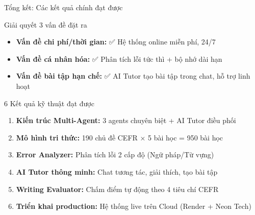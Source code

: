 \documentclass[notheorems,hyperref={bookmarks=true}]{beamer}
\begin{document}
\begin{frame}{Tổng kết: Các kết quả chính đạt được}
\begin{exampleblock}{Giải quyết 3 vấn đề đặt ra}
    \begin{itemize}
        \item \textbf{Vấn đề chi phí/thời gian:} ✅ Hệ thống online miễn phí, 24/7
        \item \textbf{Vấn đề cá nhân hóa:} ✅ Phân tích lỗi tức thì + bộ nhớ dài hạn
        \item \textbf{Vấn đề bài tập hạn chế:} ✅ AI Tutor tạo bài tập trong chat, hỗ trợ linh hoạt
    \end{itemize}
\end{exampleblock}

\begin{block}{6 Kết quả kỹ thuật đạt được}
    \begin{enumerate}
        \item \textbf{Kiến trúc Multi-Agent:} 3 agents chuyên biệt + AI Tutor điều phối
        \item \textbf{Mô hình tri thức:} 190 chủ đề CEFR × 5 bài học = 950 bài học
        \item \textbf{Error Analyzer:} Phân tích lỗi 2 cấp độ (Ngữ pháp/Từ vựng)
        \item \textbf{AI Tutor thông minh:} Chat tương tác, giải thích, tạo bài tập
        \item \textbf{Writing Evaluator:} Chấm điểm tự động theo 4 tiêu chí CEFR
        \item \textbf{Triển khai production:} Hệ thống live trên Cloud (Render + Neon Tech)
    \end{enumerate}
\end{block}
\end{frame}
\end{document}
